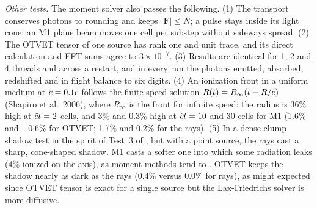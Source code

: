 \emph{Other tests.} The moment solver also passes the following.
(1) The transport conserves photons to rounding and keeps $|\mathbf F|\le N$; a pulse stays
inside its light cone; an M1 plane beam moves one cell per substep without sideways spread.
(2) The OTVET tensor of one source has rank one and unit trace, and its direct calculation and FFT sums agree
to $3\times10^{-7}$.
(3) Results are identical for 1, 2 and 4 threads and across a restart, and in every run the photons
emitted, absorbed, redshifted and in flight balance to six digits.
(4) An ionization front in a uniform medium at $\hat{c}=0.1c$ follows the finite-speed solution
$R(t)=R_\infty(t-R/\hat{c})$ (Shapiro et al.\ 2006), where $R_\infty$ is the front for infinite speed: the
radius is 36\% high at $\hat{c} t=2$ cells, and 3\% and 0.3\% high at $\hat{c} t=10$ and 30 cells for M1
(1.6\% and $-0.6$\% for OTVET; 1.7\% and 0.2\% for the rays).
(5) In a dense-clump shadow test in the spirit of Test~3 of \citet{iliev06}, but with a
point source, the rays cast a sharp, cone-shaped shadow. M1 casts a softer one into which
some radiation leaks (4\% ionized on the axis), as moment methods tend to
\citep{rosdahl13}. OTVET keeps the shadow nearly as dark as the rays (0.4\% versus 0.0\% for rays), as might expected since OTVET
tensor is exact for a single source but the Lax-Friedrichs solver is more diffusive. %


